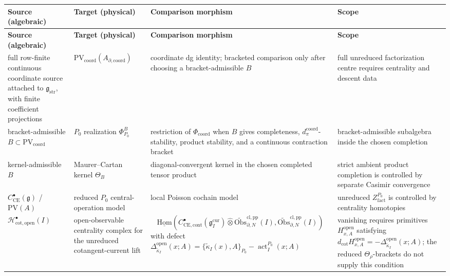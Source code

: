 \begin{longtable}{@{}>{\raggedright\arraybackslash}p{}
  >{\raggedright\arraybackslash}p{}
  >{\raggedright\arraybackslash}p{}
  >{\raggedright\arraybackslash}p{}@{}}
\hline
\textbf{Source (algebraic)} & \textbf{Target (physical)} &
\textbf{Comparison morphism} &
\textbf{Scope}\\
\hline
\endfirsthead
\hline
\textbf{Source (algebraic)} & \textbf{Target (physical)} &
\textbf{Comparison morphism} &
\textbf{Scope}\\
\hline
\endhead
full row-finite continuous coordinate source attached to
\(\mathfrak g_{\mathrm{str}}\), with finite coefficient projections &
\(\mathrm{PV}_{\mathrm{coord}}(A_{\partial,\mathrm{coord}})\) &
coordinate dg identity; bracketed comparison only after choosing a
bracket-admissible \(B\) &
full unreduced factorization centre requires centrality and descent data\\
\hline
bracket-admissible \(B\subset\mathrm{PV}_{\mathrm{coord}}\) &
\(P_0\) realization \(\Phi^B_{P_0}\) &
restriction of \(\Phi_{\mathrm{coord}}\) when \(B\) gives completeness,
\(d_\pi^{\mathrm{coord}}\)-stability, product stability, and a
continuous contraction bracket &
bracket-admissible subalgebra inside the chosen completion\\
\hline
kernel-admissible \(B\) &
Maurer--Cartan kernel \(\Theta_B\) &
diagonal-convergent kernel in the chosen completed tensor product &
strict ambient product completion is controlled by separate Casimir convergence\\
\hline
\(C^\bullet_{\mathrm{CE}}(\mathfrak g)\) / \(\mathrm{PV}(A)\) &
reduced \(P_0\) central-operation model &
local Poisson cochain model &
unreduced \(Z^{P_0}_{\mathrm{fact}}\) is controlled by centrality homotopies\\
\hline
\(\mathcal H^\bullet_{\mathrm{cot,open}}(I)\) &
open-observable centrality complex for the unreduced cotangent-current
lift &
\[
  \underline{\mathrm{Hom}}\!\left(
  C^\bullet_{\mathrm{CE},\mathrm{cont}}(\mathfrak g_I^{\mathrm{cur}})
  \widehat\otimes
  \widetilde{\mathrm{Obs}}^{\mathrm{cl,pp}}_{\partial,N}(I),
  \widetilde{\mathrm{Obs}}^{\mathrm{cl,pp}}_{\partial,N}(I)\right)
\]
with defect
\(\Delta^{\mathrm{open}}_{\widetilde\kappa_I}(x;A)
=\{\widetilde\kappa_I(x),A\}_{P_0}
-\operatorname{act}^{P_0}_I(x;A)\) &
vanishing requires primitives
\(H^{\mathrm{open}}_{x,A}\) satisfying
\(d_{\mathrm{cot}}H^{\mathrm{open}}_{x,A}
=-\Delta^{\mathrm{open}}_{\widetilde\kappa_I}(x;A)\);
the reduced \(\Theta_\rho\)-brackets do not supply this condition\\

\end{longtable}
